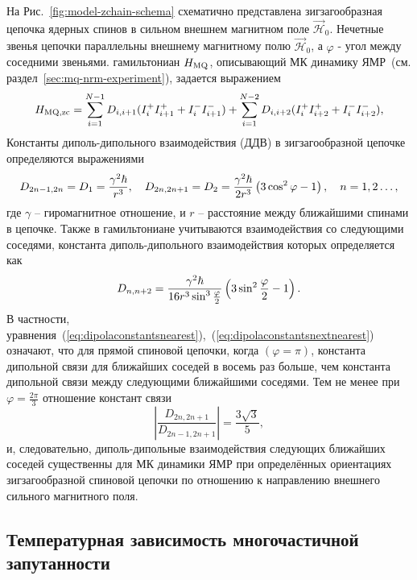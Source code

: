 На Рис.~\ref{fig:model-zchain-schema} схематично представлена
зигзагообразная цепочка ядерных спинов в сильном внешнем магнитном поле $\vec{\mathcal H}_0$.
Нечетные звенья цепочки параллельны внешнему магнитному полю $\vec{\mathcal H}_0$,
а $\varphi$ - угол между соседними звеньями.
гамильтониан $H_\mathrm{MQ}$,
описывающий МК динамику ЯМР~(см. раздел~\ref{sec:mq-nrm-experiment}),
задается выражением~\cite{Doronin2000}
%
\begin{equation}\label{hmq-next-nearest}
  H_\mathrm{MQ, zc} = \sum_{i=1}^{N-1} D_{i, i+1}(I_i^{+}I_{i+1}^{+}+ I_i^{-}I_{i+1}^{-} ) + \sum_{i=1}^{N-2} D_{i, i+2} (I_i^{+}I_{i+2}^{+}+ I_i^{-}I_{i+2}^{-} ),
\end{equation}
%
\hmqZChainNextNearestExplanatoryNote
%
Константы диполь-дипольного взаимодействия (ДДВ)
в зигзагообразной цепочке определяются выражениями~\cite{Abragam1982}
%
\begin{equation}\label{eq:dipolaconstantsnearest}
  D_{2n-1, 2n} = D_1 =\dfrac{\gamma^2\hbar }{r^3},
  \quad
  D_{2n, 2n+1} = D_2=\dfrac{\gamma^2\hbar }{2r^3}\left( 3\cos^2 \varphi -1 \right),
  \quad
  n=1,2\dots,
\end{equation}
где $\gamma$ -- гиромагнитное отношение,
и $r$ -- расстояние между ближайшими спинами в цепочке.
Также в гамильтониане учитываются взаимодействия со следующими соседями,
константа диполь-дипольного взаимодействия которых определяется как~\cite{Abragam1982}
%
\begin{equation}\label{eq:dipolaconstantsnextnearest}
  D_{n, n+2}=\dfrac{\gamma^2\hbar }{16r^3 \sin^3 \frac{\varphi}{2}}\left( 3\sin^2 \frac{\varphi}{2} -1 \right).
\end{equation}
%
В частности, уравнения~(\ref{eq:dipolaconstantsnearest}),~(\ref{eq:dipolaconstantsnextnearest}) означают,
что для прямой спиновой цепочки, когда  $(\varphi=\pi)$,
константа дипольной связи для ближайших соседей в восемь раз больше,
чем константа дипольной связи между следующими ближайшими соседями.
Тем не менее при $\varphi=\frac{2\pi}{3}$ отношение констант связи
\begin{equation}
  \left|\dfrac{D_{2n, 2n+1}}{D_{2n-1, 2n+1}}\right| = \dfrac{3\sqrt{3}}{5},
\end{equation}
и, следовательно,
диполь-дипольные взаимодействия следующих ближайших соседей
существенны для МК динамики ЯМР при определённых ориентациях зигзагообразной спиновой цепочки
по отношению к направлению внешнего сильного магнитного поля.


\subsection{Температурная зависимость многочастичной запутанности}


